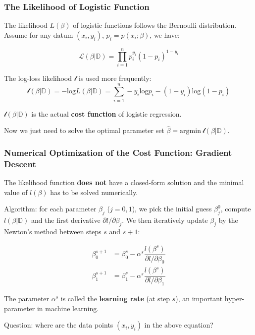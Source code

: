 \documentclass[10pt,aspectratio=169]{beamer}
\begin{document}
       \begin{frame}
         \frametitle{The Likelihood of Logistic Function}

         The likelihood $L(\beta)$ of logistic functions follows the
         Bernoulli distribution. Assume for any datum
         $(x_{i}, y_{i})$, $p_{i} = p(x_{i}; \beta)$, we have:

        \begin{equation*}
          \mathscr{L}(\beta|\mathbb{D}) = \prod_{i=1}^{n} p_{i}^{y_{i}} (1 - p_{i})^{1-y_{i}}
        \end{equation*}

        The log-loss likelihood $\mathscr{l}$ is used more frequently:
        \begin{equation*}
          \mathscr{l}(\beta|\mathbb{D}) = -\mathrm{log} L(\beta|\mathbb{D}) = \sum_{i=1}^{n} -y_{i} \mathrm{log}p_{i} -  (1 - y_{i}) \mathrm{log}(1 - p_{i})
        \end{equation*}
        
        
        $\mathscr{l}(\beta|\mathbb{D})$ is the actual \textbf{cost
          function} of logistic regression.  \vfill
        
        Now we just need to solve the optimal parameter set
        $\hat{\beta} = \mathrm{argmin}\
        \mathscr{l}(\beta|\mathbb{D})$.
        
      \end{frame}


      \begin{frame}
        \frametitle{Numerical Optimization of the Cost Function:
          Gradient Descent}
        The likelihood function \textbf{does not} have a closed-form
        solution and the minimal value of $l(\beta)$ has to be solved
        numerically.

        \vfill Algorithm: for each parameter $\beta_{j}$ ($j=0, 1$),
        we pick the initial guess $\beta_{j}^{0}$, compute
        $l(\beta|\mathbb{D})$ and the first derivative
        $\partial l/\partial \beta_{j}$. We then iteratively update
        $\beta_{j}$ by the Newton's method between steps $s$ and
        $s+1$:

        \begin{align*}
          \beta_{0}^{s+1} &= \beta_{0}^{s} - \alpha^{s} \dfrac{l(\beta^{s})}{\partial l/\partial \beta_{0}} \\
          \beta_{1}^{s+1} &= \beta_{1}^{s} - \alpha^{s} \dfrac{l(\beta^{s})}{\partial l/\partial \beta_{1}}
        \end{align*}

        The parameter $\alpha^{s}$ is called the \textbf{learning
          rate} (at step $s$), an important hyper-parameter in machine
        learning.

        \vfill Question: where are the data points $(x_{i}, y_{i})$ in
        the above equation?

      \end{frame}
\end{document}
